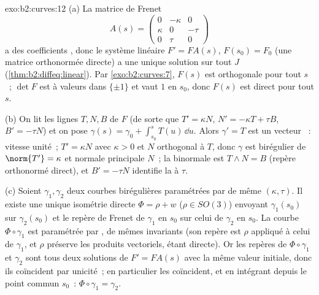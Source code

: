 \begin{solution}{exo:b2:curves:12}
(a) La matrice de Frenet
\[
A(s) = \begin{pmatrix} 0 & -\kappa & 0\\ \kappa & 0 & -\tau\\
0 & \tau & 0\end{pmatrix}
\]
a des coefficients , donc le système linéaire $F' = FA(s)$,
$F(s_0) = F_0$ (une matrice orthonormée directe) a une unique
solution sur tout $J$ (\cref{thm:b2:diffeq:linear}). Par
\cref{exo:b2:curves:7}, $F(s)$ est orthogonale pour tout $s$~;
$\det F$ est  à valeurs dans $\{\pm1\}$ et vaut
$1$ en $s_0$, donc $F(s)$ est direct pour tout $s$.

(b) On lit les lignes $T, N, B$ de $F$ (de sorte que $T' = \kappa
N$, $N' = -\kappa T + \tau B$, $B' = -\tau N$) et on pose
$\gamma(s) = \gamma_0 + \int_{s_0}^s T(u)\,\dd u$. Alors
$\gamma' = T$ est un vecteur ~: vitesse unité~; $T' = \kappa N$
avec $\kappa > 0$ et $N$  orthogonal à $T$, donc $\gamma$
est birégulier de  $\norm{T'} = \kappa$ et
normale principale $N$~; la binormale est $T \wedge N = B$
(repère orthonormé direct), et $B' = -\tau N$ identifie la
 à $\tau$.

(c) Soient $\gamma_1, \gamma_2$ deux courbes birégulières
paramétrées par  de même $(\kappa, \tau)$. Il existe
une unique isométrie directe $\Phi = \rho + w$ ($\rho \in SO(3)$)
envoyant
$\gamma_1(s_0)$ sur $\gamma_2(s_0)$ et le repère de Frenet de
$\gamma_1$ en $s_0$ sur celui de $\gamma_2$ en $s_0$. La courbe
$\Phi\circ\gamma_1$ est paramétrée par , de mêmes
invariants
(son repère est $\rho$ appliqué à celui de $\gamma_1$, et
$\rho$ préserve les produits vectoriels, étant directe). Or les
repères de $\Phi\circ\gamma_1$ et $\gamma_2$ sont tous deux
solutions de $F' =
FA(s)$ avec la même valeur initiale, donc ils coïncident par
unicité~; en particulier les  coïncident, et en intégrant
depuis le point commun $s_0$~: $\Phi\circ\gamma_1 = \gamma_2$.
\end{solution}

